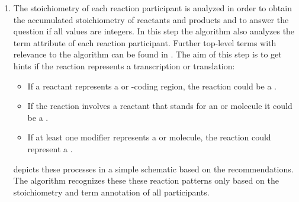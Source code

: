 \begin{enumerate}
  \item The stoichiometry of each reaction participant is analyzed in order to obtain the accumulated stoichiometry of reactants and products and to answer the question if all values are integers.
In this step the algorithm also analyzes the \SBO term \citep{Courtot2011} attribute of each reaction participant.
Further top-level \SBO terms with relevance to the algorithm can be found in .
The aim of this step is to get hints if the reaction represents a transcription or translation:
  \begin{itemize}
    \item If a reactant represents a \gene or {\gene}-coding region, the reaction could be a \transcription.
    \item If the reaction involves a reactant that stands for an \RNA or \mRNA molecule it could be a \translation.
    \item If at least one modifier represents a \gene or \RNA molecule, the reaction could represent a \translation.
  \end{itemize}
   depicts these processes in a simple schematic based on the \SBGN recommendations.
  The algorithm recognizes these these reaction patterns only based on the stoichiometry and \SBO term annotation of all participants.


\end{enumerate}
